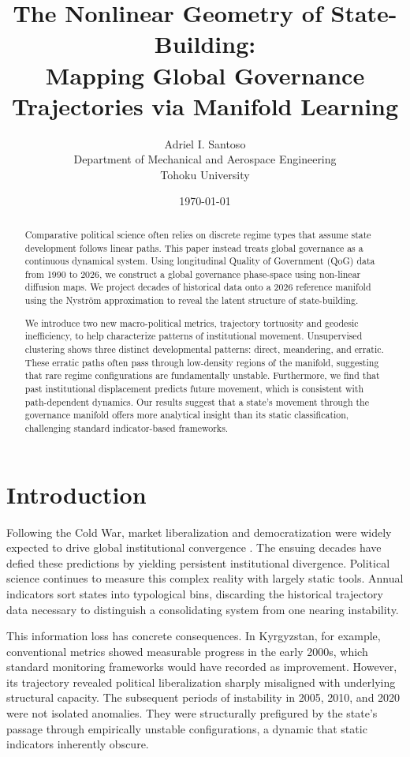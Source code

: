 \documentclass[12pt]{article}
\title{The Nonlinear Geometry of State-Building: \\Mapping Global Governance Trajectories via Manifold Learning}
\author{
Adriel I. Santoso \\
Department of Mechanical and Aerospace Engineering \\
Tohoku University
}
\date{\today}
\begin{document}
\maketitle

\begin{abstract}
    Comparative political science often relies on discrete regime types that assume state development follows linear paths. This paper instead treats global governance as a continuous dynamical system. Using longitudinal Quality of Government (QoG) data from 1990 to 2026, we construct a global governance phase-space using non-linear diffusion maps. We project decades of historical data onto a 2026 reference manifold using the Nyström approximation to reveal the latent structure of state-building.

    We introduce two new macro-political metrics, trajectory tortuosity and geodesic inefficiency, to help characterize patterns of institutional movement. Unsupervised clustering shows three distinct developmental patterns: direct, meandering, and erratic. These erratic paths often pass through low-density regions of the manifold, suggesting that rare regime configurations are fundamentally unstable. Furthermore, we find that past institutional displacement predicts future movement, which is consistent with path-dependent dynamics. Our results suggest that a state’s movement through the governance manifold offers more analytical insight than its static classification, challenging standard indicator-based frameworks.
\end{abstract}

\section{Introduction}

Following the Cold War, market liberalization and democratization were widely expected to drive global institutional convergence \cite{fukuyama1989end, fukuyama2011origins, carothers2002end}. The ensuing decades have defied these predictions by yielding persistent institutional divergence. Political science continues to measure this complex reality with largely static tools. Annual indicators sort states into typological bins, discarding the historical trajectory data necessary to distinguish a consolidating system from one nearing instability.

This information loss has concrete consequences. In Kyrgyzstan, for example, conventional metrics showed measurable progress in the early 2000s, which standard monitoring frameworks would have recorded as improvement. However, its trajectory revealed political liberalization sharply misaligned with underlying structural capacity. The subsequent periods of instability in 2005, 2010, and 2020 were not isolated anomalies. They were structurally prefigured by the state's passage through empirically unstable configurations, a dynamic that static indicators inherently obscure.
\end{document}
